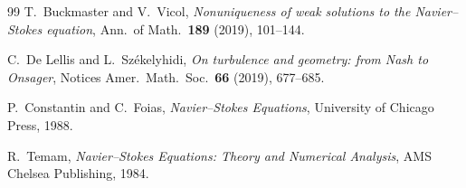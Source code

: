 \documentclass[12pt,a4paper]{article}
\theoremstyle{remark}
\begin{document}
\begin{thebibliography}{99}
T.~Buckmaster and V.~Vicol,
\textit{Nonuniqueness of weak solutions to the Navier--Stokes equation},
Ann.\ of Math.\ \textbf{189} (2019), 101--144.

C.~De Lellis and L.~Székelyhidi,
\textit{On turbulence and geometry: from Nash to Onsager},
Notices Amer.\ Math.\ Soc.\ \textbf{66} (2019), 677--685.

P.~Constantin and C.~Foias,
\textit{Navier--Stokes Equations},
University of Chicago Press, 1988.

R.~Temam,
\textit{Navier--Stokes Equations: Theory and Numerical Analysis},
AMS Chelsea Publishing, 1984.

\end{thebibliography}
\end{document}

